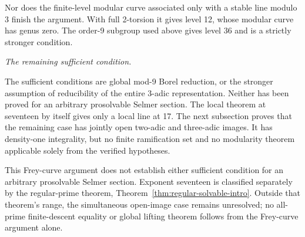 \begin{remark}
Nor does the finite-level modular curve associated only with a stable
line modulo 3 finish the argument. With full 2-torsion it gives level
12, whose modular curve has genus zero. The order-9 subgroup used above
gives level 36 and is a strictly stronger condition.

\end{remark}

\par\medskip\noindent\textit{The remaining sufficient condition.}\quad 

The sufficient conditions are global mod-9 Borel reduction, or
the stronger assumption of reducibility of the entire 3-adic
representation. Neither has been proved for an arbitrary prosolvable
Selmer section. The local theorem at seventeen by itself gives only a local line at
17. The next subsection proves that the remaining case has jointly open
two-adic and three-adic images. It has density-one integrality, but no
finite ramification set and no modularity theorem applicable solely from
the verified hypotheses.

This Frey-curve argument does not establish either sufficient condition
for an arbitrary prosolvable Selmer section. Exponent seventeen is
classified separately by the regular-prime theorem,
Theorem~\ref{thm:regular-solvable-intro}. Outside that theorem's range,
the simultaneous open-image case remains unresolved; no all-prime
finite-descent equality or global lifting theorem follows from the
Frey-curve argument alone.
